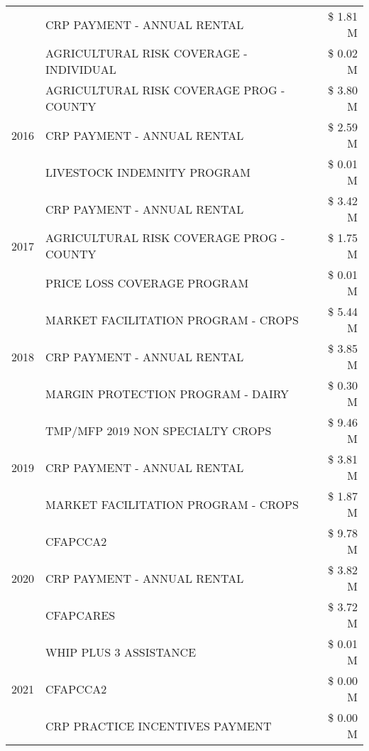 \begin{tabular}{llr}
 & CRP PAYMENT - ANNUAL RENTAL & \$ 1.81 M \\
 & AGRICULTURAL RISK COVERAGE - INDIVIDUAL & \$ 0.02 M \\
\cline{1-3}
\multirow[t]{3}{*}{2016} & AGRICULTURAL RISK COVERAGE PROG - COUNTY & \$ 3.80 M \\
 & CRP PAYMENT - ANNUAL RENTAL & \$ 2.59 M \\
 & LIVESTOCK INDEMNITY PROGRAM & \$ 0.01 M \\
\cline{1-3}
\multirow[t]{3}{*}{2017} & CRP PAYMENT - ANNUAL RENTAL & \$ 3.42 M \\
 & AGRICULTURAL RISK COVERAGE PROG - COUNTY & \$ 1.75 M \\
 & PRICE LOSS COVERAGE PROGRAM & \$ 0.01 M \\
\cline{1-3}
\multirow[t]{3}{*}{2018} & MARKET FACILITATION PROGRAM - CROPS & \$ 5.44 M \\
 & CRP PAYMENT - ANNUAL RENTAL & \$ 3.85 M \\
 & MARGIN PROTECTION PROGRAM - DAIRY & \$ 0.30 M \\
\cline{1-3}
\multirow[t]{3}{*}{2019} & TMP/MFP 2019 NON SPECIALTY CROPS & \$ 9.46 M \\
 & CRP PAYMENT - ANNUAL RENTAL & \$ 3.81 M \\
 & MARKET FACILITATION PROGRAM - CROPS & \$ 1.87 M \\
\cline{1-3}
\multirow[t]{3}{*}{2020} & CFAPCCA2 & \$ 9.78 M \\
 & CRP PAYMENT - ANNUAL RENTAL & \$ 3.82 M \\
 & CFAPCARES & \$ 3.72 M \\
\cline{1-3}
\multirow[t]{3}{*}{2021} & WHIP PLUS 3 ASSISTANCE & \$ 0.01 M \\
 & CFAPCCA2 & \$ 0.00 M \\
 & CRP PRACTICE INCENTIVES PAYMENT & \$ 0.00 M \\
\cline{1-3}
\bottomrule
\end{tabular}

